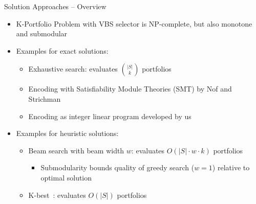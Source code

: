 \documentclass[en]{sdqbeamer}
\begin{document}
\begin{frame}[t]{Solution Approaches -- Overview}
	\begin{itemize}
		\item K-Portfolio Problem with VBS selector is NP-complete, but also monotone and submodular~\cite{nof2020real}
		\pause
		\vspace{\baselineskip}
		\item Examples for exact solutions:
		\begin{itemize}
			\item Exhaustive search: evaluates $\binom{|S|}{k}$ portfolios
			\pause
			\item Encoding with Satisfiability Module Theories (SMT) by Nof and Strichman~\cite{nof2020real}
			\pause
			\item Encoding as integer linear program developed by us
		\end{itemize}
		\pause
		\vspace{\baselineskip}
		\item Examples for heuristic solutions:
		\begin{itemize}
			\item Beam search with beam width $w$: evaluates $O(|S| \cdot w \cdot k)$ portfolios
			\begin{itemize}
				\item Submodularity bounds quality of greedy search ($w=1$) relative to optimal solution~\cite{nemhauser1978analysis, nof2020real}
			\end{itemize}
			\pause
			\item K-best~\cite{nof2020real}: evaluates $O(|S|)$ portfolios
		\end{itemize}
	\end{itemize}
\end{frame}
\end{document}
